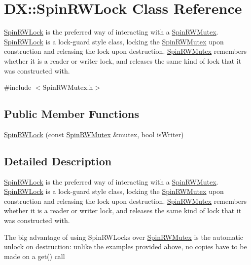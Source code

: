 \hypertarget{class_d_x_1_1_spin_r_w_lock}{\section{D\-X\-:\-:Spin\-R\-W\-Lock Class Reference}
\label{class_d_x_1_1_spin_r_w_lock}
}


\hyperlink{class_d_x_1_1_spin_r_w_lock}{Spin\-R\-W\-Lock} is the preferred way of interacting with a \hyperlink{class_d_x_1_1_spin_r_w_mutex}{Spin\-R\-W\-Mutex}. \hyperlink{class_d_x_1_1_spin_r_w_lock}{Spin\-R\-W\-Lock} is a lock-\/guard style class, locking the \hyperlink{class_d_x_1_1_spin_r_w_mutex}{Spin\-R\-W\-Mutex} upon construction and releasing the lock upon destruction. \hyperlink{class_d_x_1_1_spin_r_w_mutex}{Spin\-R\-W\-Mutex} remembers whether it is a reader or writer lock, and releases the same kind of lock that it was constructed with.  




{\ttfamily \#include $<$Spin\-R\-W\-Mutex.\-h$>$}

\subsection*{Public Member Functions}
\begin{DoxyCompactItemize}
\item 
\hyperlink{class_d_x_1_1_spin_r_w_lock_a031480610e0da0bd664ada662057b99c}{Spin\-R\-W\-Lock} (const \hyperlink{class_d_x_1_1_spin_r_w_mutex}{Spin\-R\-W\-Mutex} \&mutex, bool is\-Writer)
\end{DoxyCompactItemize}


\subsection{Detailed Description}
\hyperlink{class_d_x_1_1_spin_r_w_lock}{Spin\-R\-W\-Lock} is the preferred way of interacting with a \hyperlink{class_d_x_1_1_spin_r_w_mutex}{Spin\-R\-W\-Mutex}. \hyperlink{class_d_x_1_1_spin_r_w_lock}{Spin\-R\-W\-Lock} is a lock-\/guard style class, locking the \hyperlink{class_d_x_1_1_spin_r_w_mutex}{Spin\-R\-W\-Mutex} upon construction and releasing the lock upon destruction. \hyperlink{class_d_x_1_1_spin_r_w_mutex}{Spin\-R\-W\-Mutex} remembers whether it is a reader or writer lock, and releases the same kind of lock that it was constructed with. 

The big advantage of using Spin\-R\-W\-Locks over \hyperlink{class_d_x_1_1_spin_r_w_mutex}{Spin\-R\-W\-Mutex} is the automatic unlock on destruction\-: unlike the examples provided above, no copies have to be made on a get() call

